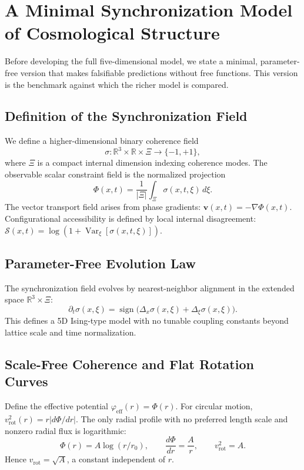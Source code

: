 \documentclass[11pt, a4paper, twocolumn]{article}
\newcommand{\Sfield}{\mathcal{S}}
\begin{document}
\section{A Minimal Synchronization Model of Cosmological Structure}

Before developing the full five-dimensional model, we state a minimal,
parameter-free version that makes falsifiable predictions without free
functions. This version is the benchmark against which the richer model is
compared.

\subsection{Definition of the Synchronization Field}

We define a higher-dimensional binary coherence field
\[
    \sigma : \mathbb{R}^3 \times \mathbb{R} \times \Xi \to \{-1,+1\},
\]
where $\Xi$ is a compact internal dimension indexing coherence modes. The
observable scalar constraint field is the normalized projection
\[
    \Phi(x,t) = \frac{1}{|\Xi|} \int_{\Xi} \sigma(x,t,\xi)\,d\xi.
\]
The vector transport field arises from phase gradients:
$\mathbf{v}(x,t) = -\nabla\Phi(x,t)$. Configurational accessibility is defined
by local internal disagreement:
$\Sfield(x,t) = \log(1 + \operatorname{Var}_\xi[\sigma(x,t,\xi)])$.

\subsection{Parameter-Free Evolution Law}

The synchronization field evolves by nearest-neighbor alignment in the extended
space $\mathbb{R}^3 \times \Xi$:
\[
    \partial_t \sigma(x,\xi)
    =
    \operatorname{sign}\!\bigl(
        \Delta_x \sigma(x,\xi)
        +
        \Delta_{\xi} \sigma(x,\xi)
    \bigr).
\]
This defines a 5D Ising-type model with no tunable coupling constants beyond
lattice scale and time normalization.

\subsection{Scale-Free Coherence and Flat Rotation Curves}

Define the effective potential $\varphi_{\mathrm{eff}}(r) = \Phi(r)$. For
circular motion, $v_{\mathrm{rot}}^2(r) = r|d\Phi/dr|$. The only radial profile
with no preferred length scale and nonzero radial flux is logarithmic:
\[
    \Phi(r) = A\log(r/r_0),
    \qquad
    \frac{d\Phi}{dr} = \frac{A}{r},
    \qquad
    v_{\mathrm{rot}}^2 = A.
\]
Hence $v_{\mathrm{rot}} = \sqrt{A}$, a constant independent of $r$.
\end{document}
